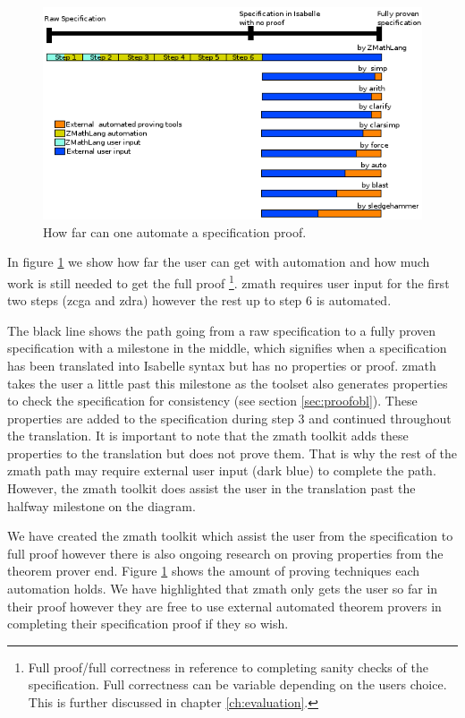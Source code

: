 \begin{figure}[H]
 \begin{center}
 \includegraphics [scale=0.75]{Figures/Design/timeline.png}
 \caption{How far can one automate a specification proof.}
 \label{fig:timeline}
\end{center}
\end{figure} 

In figure \ref{fig:timeline} we show how far the user can get with automation and how much work is still needed to get the full proof \footnote{Full proof/full correctness in reference to completing sanity checks of the specification. Full correctness can be variable depending on the users choice. This is further discussed in chapter \ref{ch:evaluation}.}. \Gls{zmath} requires user input for the first two steps (\gls{zcga} and \gls{zdra}) however the rest up to step 6 is automated.

The black line shows the path going from a raw specification to a fully proven specification with a milestone in the middle, which signifies when a specification has been translated into Isabelle syntax but has no properties or proof. \Gls{zmath} takes the user a little past this milestone as the toolset also generates properties to check the specification for consistency (see section \ref{sec:proofobl}). These properties are added to the specification during step 3 and continued throughout the translation. It is important to note that the \gls{zmath} toolkit adds these properties to the translation but does not prove them. That is why the rest of the \gls{zmath} path may require external user input (dark blue) to complete the path. However, the \gls{zmath} toolkit does assist the user in the translation past the halfway milestone on the diagram.

We have created the \Gls{zmath} toolkit which assist the user from the specification to full proof however there is also ongoing research on proving properties from the theorem prover end. Figure \ref{fig:timeline} shows the amount of proving techniques each automation holds. We have highlighted that \gls{zmath} only gets the user so far in their proof however they are free to use external automated theorem provers in completing their specification proof if they so wish.

